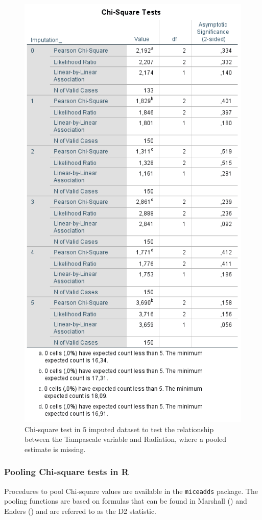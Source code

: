 \documentclass[
]{book}
\begin{document}
\begin{figure}

{\centering \includegraphics[width=0.7\linewidth]{images/table5.6} 

}

\caption{Chi-square test in 5 imputed dataset to test the relationship between the Tampascale variable and Radiation, where a pooled estimate is missing.}\label{fig:tab5-6}
\end{figure}

\hypertarget{pooling-chi-square-tests-in-r}{%
\subsubsection{Pooling Chi-square tests in R}\label{pooling-chi-square-tests-in-r}}

Procedures to pool Chi-square values are available in the \texttt{miceadds} package. The pooling functions are based on formulas that can be found in Marshall (\citet{Marshall2009MedResMeth}) and Enders (\citet{enders2010applied}) and are referred to as the D2 statistic.
\end{document}
